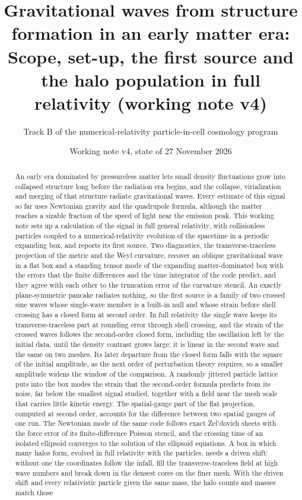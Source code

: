 \documentclass[aps,prd,twocolumn,10pt,superscriptaddress,nofootinbib,longbibliography,floatfix]{revtex4-2}
\begin{document}
\title{Gravitational waves from structure formation in an early matter era:\\ Scope, set-up, the first source and the halo population in full relativity (working note v4)}

\author{Track B of the numerical-relativity particle-in-cell cosmology program}

\date{Working note v4, state of 27 November 2026}

\begin{abstract}
An early era dominated by pressureless matter lets small density fluctuations grow into collapsed structure long before the radiation era begins, and the collapse, virialization and merging of that structure radiate gravitational waves. Every estimate of this signal so far uses Newtonian gravity and the quadrupole formula, although the matter reaches a sizable fraction of the speed of light near the emission peak. This working note sets up a calculation of the signal in full general relativity, with collisionless particles coupled to a numerical-relativity evolution of the spacetime in a periodic expanding box, and reports its first source. Two diagnostics, the transverse-traceless projection of the metric and the Weyl curvature, recover an oblique gravitational wave in a flat box and a standing tensor mode of the expanding matter-dominated box with the errors that the finite differences and the time integrator of the code predict, and they agree with each other to the truncation error of the curvature stencil. An exactly plane-symmetric pancake radiates nothing, so the first source is a family of two crossed sine waves whose single-wave member is a built-in null and whose strain before shell crossing has a closed form at second order. In full relativity the single wave keeps its transverse-traceless part at rounding error through shell crossing, and the strain of the crossed waves follows the second-order closed form, including the oscillation left by the initial data, until the density contrast grows large; it is linear in the second wave and the same on two meshes. Its later departure from the closed form falls with the square of the initial amplitude, as the next order of perturbation theory requires, so a smaller amplitude widens the window of the comparison. A randomly jittered particle lattice puts into the box modes the strain that the second-order formula predicts from its noise, far below the smallest signal studied, together with a field near the mesh scale that carries little kinetic energy. The spatial-gauge part of the flat projection, computed at second order, accounts for the difference between two spatial gauges of one run. The Newtonian mode of the same code follows exact Zel'dovich sheets with the force error of its finite-difference Poisson stencil, and the crossing time of an isolated ellipsoid converges to the solution of the ellipsoid equations. A box in which many halos form, evolved in full relativity with the particles, needs a driven shift: without one the coordinates follow the infall, fill the transverse-traceless field at high wave numbers and break down in the densest cores on the finer mesh. With the driven shift and every relativistic particle given the same mass, the halo counts and masses match those 
\end{abstract}
\end{document}
